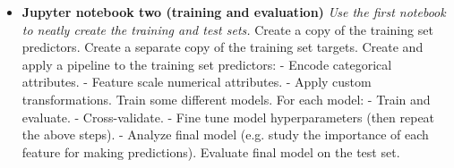\begin{itemize}
\item
\textbf{Jupyter notebook two (training and evaluation)}\newline
\textit{Use the first notebook to neatly create the training and test sets.}\newline
Create a copy of the training set predictors.\newline
Create a separate copy of the training set targets.\newline
\newline
Create and apply a pipeline to the training set predictors:\newline
- Encode categorical attributes.\newline
- Feature scale numerical attributes.\newline
- Apply custom transformations.\newline
\newline
Train some different models. For each model:\newline
- Train and evaluate.\newline
- Cross-validate.\newline
- Fine tune model hyperparameters (then repeat the above steps).\newline
- Analyze final model (e.g. study the importance of each feature for making predictions).\newline
\newline
Evaluate final model on the test set.
\end{itemize}

\newpage